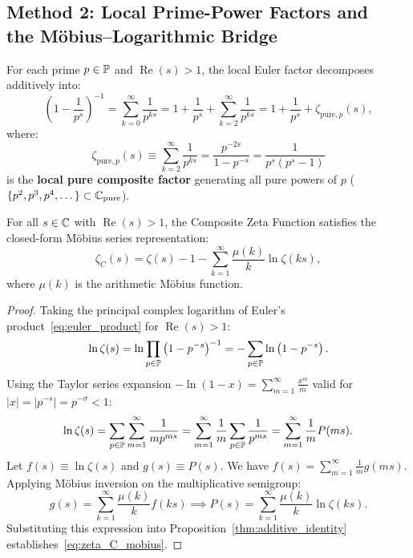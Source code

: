 \subsection{\texorpdfstring{Method 2: Local Prime-Power Factors and\\ the M\"obius--Logarithmic Bridge}{Method 2: Local Prime-Power Factors and the Mobius-Logarithmic Bridge}}

\begin{definition}
\label{def:local_euler}
\leanok
For each prime $p \in \mathbb{P}$ and $\operatorname{Re}(s) > 1$, the local Euler factor decomposes additively into:
\begin{equation}
\label{eq:local_factor}
\left(1 - \frac{1}{p^s}\right)^{-1} = \sum_{k=0}^\infty \frac{1}{p^{k s}} = 1 + \frac{1}{p^s} + \sum_{k=2}^\infty \frac{1}{p^{k s}} = 1 + \frac{1}{p^s} + \zeta_{\mathrm{pure}, p}(s),
\end{equation}
where:
\begin{equation}
\label{eq:pure_prime_factor}
\zeta_{\mathrm{pure}, p}(s) \equiv \sum_{k=2}^\infty \frac{1}{p^{k s}} = \frac{p^{-2s}}{1 - p^{-s}} = \frac{1}{p^s(p^s - 1)}
\end{equation}
is the \textbf{local pure composite factor} generating all pure powers of $p$ ($\{p^2, p^3, p^4, \dots\} \subset \mathbb{C}_{\mathrm{pure}}$).
\end{definition}

\begin{theorem}
\label{thm:mobius_bridge}
\leanok
For all $s \in \mathbb{C}$ with $\operatorname{Re}(s) > 1$, the Composite Zeta Function satisfies the closed-form M\"obius series representation:
\begin{equation}
\label{eq:zeta_C_mobius}
\zeta_C(s) = \zeta(s) - 1 - \sum_{k=1}^\infty \frac{\mu(k)}{k} \ln \zeta(k s),
\end{equation}
where $\mu(k)$ is the arithmetic M\"obius function.
\end{theorem}

\begin{proof}
\leanok
Taking the principal complex logarithm of Euler's product~\eqref{eq:euler_product} for $\operatorname{Re}(s) > 1$:
$$\ln \zeta(s) = \ln \prod_{p \in \mathbb{P}} \left(1 - p^{-s}\right)^{-1} = -\sum_{p \in \mathbb{P}} \ln\left(1 - p^{-s}\right).$$
Using the Taylor series expansion $-\ln(1 - x) = \sum_{m=1}^\infty \frac{x^m}{m}$ valid for $|x| = |p^{-s}| = p^{-\sigma} < 1$:
$$\ln \zeta(s) = \sum_{p \in \mathbb{P}} \sum_{m=1}^\infty \frac{1}{m p^{m s}} = \sum_{m=1}^\infty \frac{1}{m} \sum_{p \in \mathbb{P}} \frac{1}{p^{m s}} = \sum_{m=1}^\infty \frac{1}{m} P(m s).$$
Let $f(s) \equiv \ln \zeta(s)$ and $g(s) \equiv P(s)$. We have $f(s) = \sum_{m=1}^\infty \frac{1}{m} g(m s)$.
Applying M\"obius inversion on the multiplicative semigroup:
$$g(s) = \sum_{k=1}^\infty \frac{\mu(k)}{k} f(k s) \implies P(s) = \sum_{k=1}^\infty \frac{\mu(k)}{k} \ln \zeta(k s).$$
Substituting this expression into Proposition~\ref{thm:additive_identity} establishes~\eqref{eq:zeta_C_mobius}.
\end{proof}

